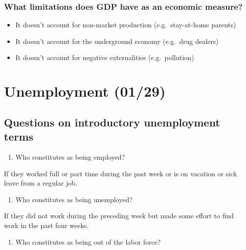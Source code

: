 \documentclass[
  letterpaper,
  DIV=11,
  numbers=noendperiod]{scrartcl}
\providecommand{\tightlist}{%
  \setlength{\itemsep}{0pt}\setlength{\parskip}{0pt}}\usepackage{longtable,booktabs,array}
\begin{document}
\subsubsection{What limitations does GDP have as an economic
measure?}\label{what-limitations-does-gdp-have-as-an-economic-measure}

\begin{itemize}
\tightlist
\item
  It doesn't account for non-market production (e.g.~stay-at-home
  parents)
\item
  It doesn't account for the underground economy (e.g.~drug dealers)
\item
  It doesn't account for negative externalities (e.g.~pollution)
\end{itemize}

\section{Unemployment (01/29)}\label{unemployment-0129}

\subsection{Questions on introductory unemployment
terms}\label{questions-on-introductory-unemployment-terms}

\begin{enumerate}
\def\labelenumi{\arabic{enumi}.}
\tightlist
\item
  Who constitutes as being employed?
\end{enumerate}

If they worked full or part time during the past week or is on vacation
or sick leave from a regular job.

\begin{enumerate}
\def\labelenumi{\arabic{enumi}.}
\setcounter{enumi}{1}
\tightlist
\item
  Who constitutes as being unemployed?
\end{enumerate}

If they did not work during the preceding week but made some effort to
find work in the past four weeks.

\begin{enumerate}
\def\labelenumi{\arabic{enumi}.}
\setcounter{enumi}{2}
\tightlist
\item
  Who constitutes as being out of the labor force?
\end{enumerate}
\end{document}
